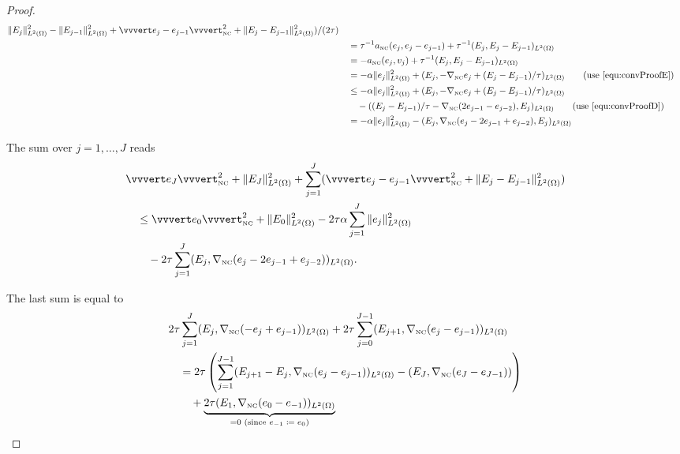 \begin{proof}
\begin{align*}
    \Vert E_j \Vert_{L^2(\Omega)}^2 - \Vert E_{j-1}\Vert_{L^2(\Omega)}^2 +
    \vvvert e_j-e_{j-1}\vvvert_\nc^2 +
    \Vert E_j - E_{j-1} \Vert_{L^2(\Omega)}^2)/(2\tau) \\
    &\quad =
    \tau^{-1}a_\nc(e_j,e_j-e_{j-1}) + \tau^{-1}(E_j,E_j-E_{j-1})_{L^2(\Omega)}\\
    &\quad =
    -a_\nc(e_j,v_j) + \tau^{-1}(E_j,E_j-E_{j-1})_{L^2(\Omega)}\\
    &\quad =
    -\alpha\Vert e_j\Vert_{L^2(\Omega)}^2 + (E_j,
    -\nabla_\nc e_j+(E_j-E_{j-1})/\tau)_{L^2(\Omega)} 
    \tag{use \eqref{equ:convProofE}}\\
    &\quad \leq
    -\alpha\Vert e_j\Vert_{L^2(\Omega)}^2 + (E_j,
    -\nabla_\nc e_j+(E_j-E_{j-1})/\tau)_{L^2(\Omega)}\\ 
    &\quad\quad -( (E_j-E_{j-1})/\tau -\gradnc(2e_{j-1}-e_{j-2}),E_j)_{L^2(\Omega)}
    \tag{use \eqref{equ:convProofD}}\\
    &\quad =
    -\alpha\Vert e_j\Vert_{L^2(\Omega)}^2 - 
    (E_j,\gradnc(e_j-2e_{j-1}+e_{j-2}),E_j)_{L^2(\Omega)}
  \end{align*}

  \noindent The sum over $j=1,\ldots,J$ reads
  \begin{align}
    \label{equ:convProofF}
    &\vvvert e_J \vvvert^2_\nc +\Vert E_J \Vert_{L^2(\Omega)}^2 
    +\sum_{j=1}^J(\vvvert e_j-e_{j-1} \vvvert_\nc^2 + 
    \Vert E_j-E_{j-1}\Vert_{L^2(\Omega)}^2)\notag \\
    &\quad \leq 
    \vvvert e_0 \vvvert_\nc^2 + \Vert E_0 \Vert_{L^2(\Omega)}^2 
    -2\tau\alpha\sum_{j=1}^J \Vert e_j\Vert^2_{L^2(\Omega)}\notag \\
    &\quad\quad
    -2\tau \sum_{j=1}^J(E_j,\gradnc (e_j-2e_{j-1}+e_{j-2}))_{L^2(\Omega)}.
  \end{align}

  \noindent The last sum is equal to
  \begin{align*}
    &2\tau\sum_{j=1}^J(E_j,\nabla_{\textup{\tiny NC}}(-e_j+e_{j-1}))_{L^2(\Omega)} +
    2\tau\sum_{j=0}^{J-1}(E_{j+1},\nabla_{\textup{\tiny NC}}(e_j-e_{j-1}))_{L^2(\Omega)} \\
    &\quad = 
    2\tau\left( 
    \sum_{j=1}^{J-1} 
    (E_{j+1}-E_j,\nabla_{\textup{\tiny NC}}(e_j-e_{j-1}))_{L^2(\Omega)}
    -(E_J,\nabla_{\textup{\tiny NC}}(e_J-e_{J-1}))\right)\\
    &\quad\quad +
    \underbrace{2\tau(E_1,
    \nabla_{\textup{\tiny NC}}(e_0-e_{-1}))_{L^2(\Omega)}}_{=0 \text{ (since 
    $e_{-1}\coloneqq e_0$)}}
  \end{align*}


\end{proof}
